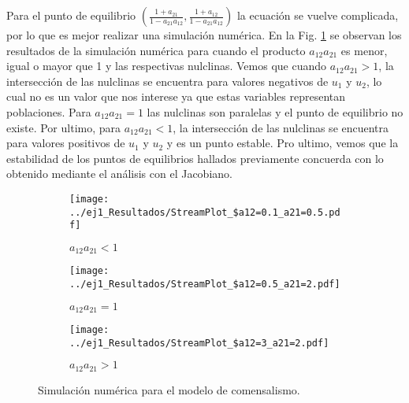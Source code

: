 Para el punto de equilibrio $\left(\frac{1+a_{21}}{1-a_{21}a_{12}},\frac{1+a_{12}}{1-a_{21}a_{12}}\right)$ la ecuación se vuelve complicada, por lo que es mejor realizar una simulación numérica. En la Fig. \ref{ej1:Simulacion} se observan los resultados de la simulación numérica para cuando el producto $a_{12} a_{21}$ es menor, igual o mayor que 1 y las respectivas nulclinas. Vemos que cuando  $a_{12} a_{21} > 1$, la intersección de las nulclinas se encuentra para valores negativos de $u_1$ y $u_2$, lo cual no es un valor que nos interese ya que estas variables representan poblaciones. Para $a_{12} a_{21} = 1$ las nulclinas son paralelas y el punto de equilibrio no existe. Por ultimo, para $a_{12} a_{21} < 1$, la intersección de las nulclinas se encuentra para valores positivos de $u_1$ y $u_2$ y es un punto estable. Pro ultimo, vemos que la estabilidad de los puntos de equilibrios hallados previamente concuerda con lo obtenido mediante el análisis con el Jacobiano.


\begin{figure}[htb!]
    \centering
    \begin{subfigure}[b]{0.48\textwidth}
        \texttt{[image: ../ej1\_Resultados/StreamPlot\_\$a12=0.1\_a21=0.5.pdf]}
        \caption{$a_{12} a_{21} < 1$}
    \end{subfigure}
    \hfill
    \begin{subfigure}[b]{0.48\textwidth}
        \texttt{[image: ../ej1\_Resultados/StreamPlot\_\$a12=0.5\_a21=2.pdf]}
        \caption{$a_{12} a_{21} = 1$}
    \end{subfigure}
    \begin{subfigure}[b]{0.48\textwidth}
        \texttt{[image: ../ej1\_Resultados/StreamPlot\_\$a12=3\_a21=2.pdf]}
        \caption{$a_{12} a_{21} > 1$}
    \end{subfigure}
    \caption{Simulación numérica para el modelo de comensalismo.}
    \label{ej1:Simulacion}
\end{figure}
